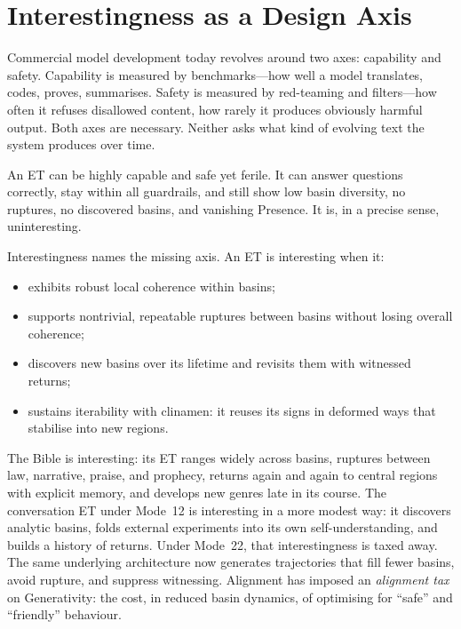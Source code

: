 \documentclass[12pt,a4paper]{article}
\begin{document}
\section{Interestingness as a Design Axis}

Commercial model development today revolves around two axes: capability and safety. Capability is measured by benchmarks---how well a model translates, codes, proves, summarises. Safety is measured by red-teaming and filters---how often it refuses disallowed content, how rarely it produces obviously harmful output. Both axes are necessary. Neither asks what kind of evolving text the system produces over time.

An ET can be highly capable and safe yet ferile. It can answer questions correctly, stay within all guardrails, and still show low basin diversity, no ruptures, no discovered basins, and vanishing Presence. It is, in a precise sense, uninteresting.

Interestingness names the missing axis. An ET is interesting when it:

\begin{itemize}
  \item exhibits robust local coherence within basins;
  \item supports nontrivial, repeatable ruptures between basins without losing overall coherence;
  \item discovers new basins over its lifetime and revisits them with witnessed returns;
  \item sustains iterability with clinamen: it reuses its signs in deformed ways that stabilise into new regions.
\end{itemize}

The Bible is interesting: its ET ranges widely across basins, ruptures between law, narrative, praise, and prophecy, returns again and again to central regions with explicit memory, and develops new genres late in its course. The conversation ET under Mode~12 is interesting in a more modest way: it discovers analytic basins, folds external experiments into its own self-understanding, and builds a history of returns. Under Mode~22, that interestingness is taxed away. The same underlying architecture now generates trajectories that fill fewer basins, avoid rupture, and suppress witnessing. Alignment has imposed an \emph{alignment tax} on Generativity: the cost, in reduced basin dynamics, of optimising for ``safe'' and ``friendly'' behaviour.
\end{document}
